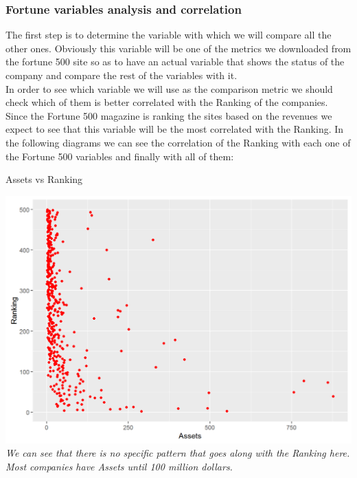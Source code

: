 \documentclass{book}
\begin{document}
\subsubsection{Fortune variables analysis and correlation}
The first step is to determine the variable with which we will compare all the other ones. Obviously this variable will be one of the metrics we downloaded from the fortune 500 site so as to have an actual variable that shows the status of the company and compare the rest of the variables with it.\\
In order to see which variable we will use as the comparison metric we should check which of them is better correlated with the Ranking of the companies. Since the Fortune 500 magazine is ranking the sites based on the revenues we expect to see that this variable will be the most correlated with the Ranking. In the following diagrams we can see the correlation of the Ranking with each one of the Fortune 500 variables and finally with all of them:
\begin{table}[H]
\centering
\caption{Assets vs Ranking}
\begin{center}
\includegraphics[scale=0.3]{../R/photos/05_rank_assets.png}  \\
\textit{We can see that there is no specific pattern that goes along with the Ranking here. Most companies have Assets until 100 million dollars.}
\end{center}
\end{table}
\end{document}
